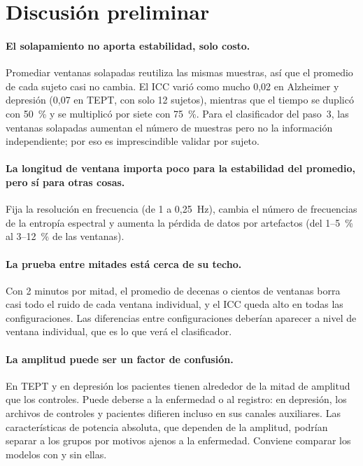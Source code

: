 \documentclass[11pt,a4paper]{article}
\begin{document}
\section{Discusión preliminar}

\paragraph{El solapamiento no aporta estabilidad, solo costo.} Promediar ventanas solapadas reutiliza las mismas muestras, así que el promedio de cada sujeto casi no cambia. El ICC varió como mucho 0,02 en Alzheimer y depresión (0,07 en TEPT, con solo 12 sujetos), mientras que el tiempo se duplicó con 50~\% y se multiplicó por siete con 75~\%. Para el clasificador del paso~3, las ventanas solapadas aumentan el número de muestras pero no la información independiente; por eso es imprescindible validar por sujeto.

\paragraph{La longitud de ventana importa poco para la estabilidad del promedio, pero sí para otras cosas.} Fija la resolución en frecuencia (de 1 a 0,25~Hz), cambia el número de frecuencias de la entropía espectral y aumenta la pérdida de datos por artefactos (del 1--5~\% al 3--12~\% de las ventanas).

\paragraph{La prueba entre mitades está cerca de su techo.} Con 2 minutos por mitad, el promedio de decenas o cientos de ventanas borra casi todo el ruido de cada ventana individual, y el ICC queda alto en todas las configuraciones. Las diferencias entre configuraciones deberían aparecer a nivel de ventana individual, que es lo que verá el clasificador.

\paragraph{La amplitud puede ser un factor de confusión.} En TEPT y en depresión los pacientes tienen alrededor de la mitad de amplitud que los controles. Puede deberse a la enfermedad o al registro: en depresión, los archivos de controles y pacientes difieren incluso en sus canales auxiliares. Las características de potencia absoluta, que dependen de la amplitud, podrían separar a los grupos por motivos ajenos a la enfermedad. Conviene comparar los modelos con y sin ellas.
\end{document}
